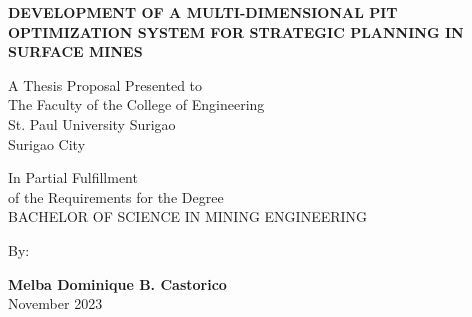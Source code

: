 \documentclass[12pt]{report}
\newcommand{\authora}{
    Melba Dominique B. Castorico %
}
\newcommand{\thetitle}{Development of a Multi-Dimensional Pit Optimization System for Strategic Planning in Surface Mines}
\begin{document}
\thispagestyle{empty}

\begin{center}

\textbf{\MakeUppercase{\thetitle}}

\vspace{1.5cm}
A Thesis Proposal Presented to \\
The Faculty of the College of Engineering \\
St. Paul University Surigao \\
Surigao City

\vfill

In Partial Fulfillment \\
of the Requirements for the Degree \\
BACHELOR OF SCIENCE IN MINING ENGINEERING

\vspace{1cm}
By:

\vspace{1cm}
\textbf{\authora} \\

\vspace{1cm}
November 2023

\end{center}


\pagestyle{fancy}
\fancyhead{}
\fancyfoot{}
\fancyhead[R]{\thepage}

\tableofcontents

\end{document}
